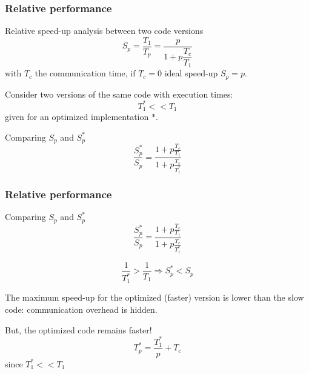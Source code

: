 \begin{frame}
  \frametitle{Relative performance}

\medskip
Relative speed-up analysis between two code versions
\begin{equation*}
S_p = \dfrac{T_1}{T_p} = \dfrac{p}{1 + p \dfrac{T_c}{T_1}}
\end{equation*}
with $T_c$ the communication time, if $T_c = 0$ ideal speed-up $S_p = p$.

\bigskip
Consider two versions of the same code with execution times:
\begin{equation*}
T_1^\ast << T_1
\end{equation*}
given for an optimized implementation $\ast$.

\medskip
Comparing $S_p$ and $S_p^\ast$
\begin{equation*}
\dfrac{S_p^\ast}{S_p} = \dfrac{1 + p \frac{T_c}{T_1}}{1 + p \frac{T_c}{T_1^\ast}}
\end{equation*}

\end{frame}

\begin{frame}
  \frametitle{Relative performance}

Comparing $S_p$ and $S_p^\ast$
\begin{equation*}
\dfrac{S_p^\ast}{S_p} = \dfrac{1 + p \frac{T_c}{T_1}}{1 + p \frac{T_c}{T_1^\ast}}
\end{equation*}

\medskip
\begin{equation*}
\frac{1}{T_1^\ast} > \frac{1}{T_1} \Rightarrow S_p^\ast < S_p
\end{equation*}

\medskip
The maximum speed-up for the optimized (faster) version is lower than the slow code: communication overhead is hidden.

\medskip
But, the optimized code remains faster!
\begin{equation*}
T_p^\ast = \frac{T_1^\ast}{p} + T_c
\end{equation*}
since $T_1^\ast << T_1$

\end{frame}

